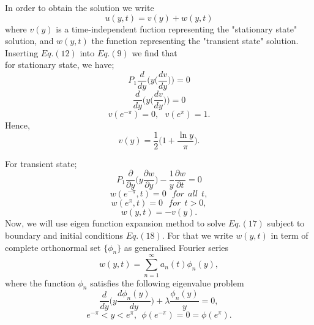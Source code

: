 \documentclass[10pt]{beamer}
\begin{document}
		\begin{frame}
		In order to obtain the solution we write
		\begin{equation}
		u ( y, t ) = v(y) + w (y, t)
		\end{equation}
		where $ v(y) $ is a time-independent fuction representing the "stationary state" solution, and $ w(y, t) $ the function representing the "transient state" solution. Inserting $  Eq. (12) $ into $ Eq. (9) $ we find that\\
		for stationary state, we have;
		\begin{equation}
		P_1 \frac{d}{dy} \bigg(y \bigg(\frac{d v}{d y} \bigg) \bigg) = 0
		\end{equation}
		\begin{equation}
		\frac{d}{d y} \bigg(y \bigg(\frac{d v}{d y} \bigg) \bigg) = 0
		\end{equation}
		\begin{equation}
		v( e^{-\pi} ) = 0, ~~~ v( e^\pi ) = 1 .
		\end{equation}
		Hence,
		\begin{equation}
		 v(y) = \frac{1}{2} \bigg( 1 + \frac{\ln{y}}{\pi} \bigg) .
		\end{equation}
				
		\end{frame}
		
		\begin{frame}
		For transient state;
		\begin{equation}
		P_1 \frac{\partial}{\partial y} \bigg( y \frac{\partial w}{\partial y} \bigg) - \frac{1}{y} \frac{\partial w}{\partial t} = 0
		\end{equation}
		$$ w ( e^{-\pi}, t ) = 0 ~~~ for ~~ all ~~ t, $$
		$$ w( e^\pi, t ) = 0 ~~~ for ~~ t>0, $$
		\begin{equation}
		  w(y, t) = -v(y).
		\end{equation}
		Now, we will use eigen function expansion method to solve $ Eq. (17) $ subject to boundary and initial conditions $ Eq. (18) $. For that we write $ w(y, t) $ in term of complete orthonormal set $ \{\phi_n\} $ as generalised Fourier series
		\begin{equation}
		w(y,t) = \sum_{n = 1}^{\infty} a_n(t) \phi_n(y),
		\end{equation}
		where the function $ \phi_n $ satisfies the following eigenvalue problem
		\begin{equation}
		\frac{d}{d y} \bigg( y \frac{d \phi_n (y)}{d y} \bigg) + \lambda \frac{\phi_n(y)}{y}
		= 0 , 
		\end{equation}
		\begin{equation}
		 e^{-\pi} < y < e^\pi, ~~ \phi(e^{-\pi}) = 0 = \phi(e^\pi).
		\end{equation}
			
		\end{frame}
		
\end{document}

